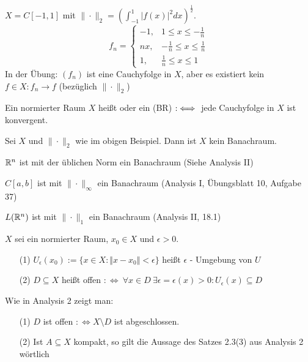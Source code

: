 \documentclass{article}
\begin{document}
\begin{beispiel}
$X=C[-1,1]$ mit $\|\cdot\|_2 = \left(\int_{-1}^1|f(x)|^2dx\right)^\frac12$.
\[f_n=
\begin{cases}
-1, & 1\le x\le -\frac1n \\
nx, & -\frac1n \le x \le \frac1n \\
1, & \frac1n \le x \le 1
\end{cases}\]
In der Übung: $(f_n)$ ist eine Cauchyfolge in $X$, aber es existiert kein $f\in X: f_n\to f$ (bezüglich $\|\cdot\|_2$)
\end{beispiel}

\begin{definition}
Ein normierter Raum $X$ heißt  oder ein  (BR) $:\iff$ jede Cauchyfolge in $X$ ist konvergent.
\end{definition}

\begin{beispiele}
\item Sei $X$ und $\|\cdot\|_2$ wie im obigen Beispiel. Dann ist $X$ kein Banachraum.
\item $\mathbb{R}^n$ ist mit der üblichen Norm ein Banachraum (Siehe Analysis II)
\item $C[a,b]$ ist mit $\|\cdot\|_\infty$ ein Banachraum (Analysis I, Übungsblatt 10, Aufgabe 37)
\item $L(\mathbb{R}^n)$ ist mit $\|\cdot\|_1$ ein Banachraum (Analysis II, 18.1)
\end{beispiele}

\begin{definition}
$X$ sei ein normierter Raum, $x_0 \in X$ und $\epsilon > 0$.
\begin{itemize}
	\item[(1)] $U_{\epsilon}(x_0) := \{ x \in X: \Vert x - x_0 \Vert < \epsilon \}$ heißt 		
	$\epsilon$ - Umgebung von $U$
	\item[(2)] $D \subseteq X$ heißt offen $: \Leftrightarrow\ \forall x \in D \ \exists \epsilon
	=	\epsilon(x) > 0 : U_{\epsilon} (x) \subseteq D$
\end{itemize}
\end{definition}

Wie in Analysis 2 zeigt man:

\begin{satz}
\begin{itemize}
	\item[(1)] $D$ ist offen $: \Leftrightarrow X \setminus D$ ist abgeschlossen.
	\item[(2)] Ist $A \subseteq X$ kompakt, so gilt die Aussage des Satzes 2.3(3) aus Analysis 2 
	wörtlich
\end{itemize}
\end{satz}
\end{document}
